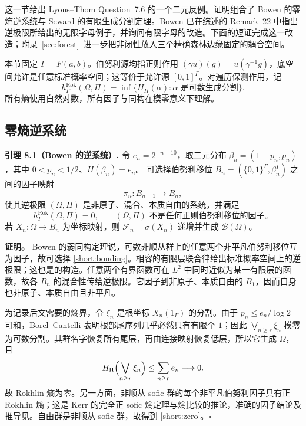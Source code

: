 \documentclass[UTF8,zihao=-4,a4paper]{ctexart}
\numberwithin{equation}{section}
\begin{document}
这一节给出 Lyons--Thom Question~7.6 的一个二元反例。证明组合了 Bowen 的零熵逆系统与 Seward 的有限生成分割定理。Bowen 已在综述的 Remark~22 中指出逆极限所给出的无限字母例子，并询问有限字母的改造\cite[\S5.3, Lemma~5.4; \S7.4, Remark~22]{BowenSurvey}。下面的短证完成这一改造；附录~\ref{sec:forest}~进一步把非闭性放入三个精确森林边缘固定的耦合空间。

本节固定 $\Gamma=F(a,b)$。伯努利源均指正则作用 $(\gamma u)(g)=u(\gamma^{-1}g)$，底空间允许是任意标准概率空间；这等价于允许源 $[0,1]^\Gamma$。对遍历保测作用，记
\[
 h^{\mathrm{Rok}}_\Gamma(\Omega,\Pi)
 =\inf\{H_\Pi(\alpha):\alpha\text{ 是可数生成分割}\}.
\]
所有熵使用自然对数，所有因子与同构在模零意义下理解。

\subsection{零熵逆系统}

\textbf{引理 8.1（Bowen 的逆系统）.}\label{short:inverse}
令 $e_n=2^{-n-10}$，取二元分布 $\beta_n=(1-p_n,p_n)$，其中 $0<p_n<1/2$、$H(\beta_n)=e_n$。
可选择伯努利移位 $B_n=(\{0,1\}^\Gamma,\beta_n^\Gamma)$ 之间的因子映射
\begin{equation}\label{short:bonding}
 \pi_n:B_{n+1}\longrightarrow B_n,
\end{equation}
使其逆极限 $(\Omega,\Pi)$ 是非原子、混合、本质自由的系统，并满足
\begin{equation}\label{short:zero}
 h^{\mathrm{Rok}}_\Gamma(\Omega,\Pi)=0,
 \qquad (\Omega,\Pi)\text{ 不是任何正则伯努利移位的因子。}
\end{equation}
若 $X_n:\Omega\to B_n$ 为坐标映射，则 $\mathcal F_n=\sigma(X_n)$ 递增并生成 $\mathcal B(\Omega)$。

\textbf{证明。}
Bowen 的弱同构定理说，可数非顺从群上的任意两个非平凡伯努利移位互为因子\cite[Corollary~1.3]{Bowen}，故可选择 \eqref{short:bonding}。相容的有限层联合律给出标准概率空间上的逆极限；这也是\cite[Lemma~5.4]{BowenSurvey}的构造。任意两个有界函数可在 $L^2$ 中同时近似为某一有限层的函数，故各 $B_n$ 的混合性传给逆极限。它因子到非原子、本质自由的 $B_1$，因而自身也非原子、本质自由且非平凡。

为记录后文需要的熵界，令 $\xi_n$ 是根坐标 $X_n(1_\Gamma)$ 的分割。由于 $p_n\le e_n/\log2$ 可和，Borel--Cantelli 表明根部尾序列几乎必然只有有限个 $1$；因此 $\bigvee_{n\ge r}\xi_n$ 模零为可数分割。其群名字恢复所有尾层，再由连接映射恢复低层，所以它生成 $\Omega$，且
\[
 H_\Pi\Bigl(\bigvee_{n\ge r}\xi_n\Bigr)
 \le\sum_{n\ge r}e_n\longrightarrow0.
\]
故 Rokhlin 熵为零。另一方面，非顺从 sofic 群的每个非平凡伯努利因子具有正 Rokhlin 熵；这是 Kerr 的完全正 sofic 熵定理\cite{Kerr}与熵比较的推论，准确的因子结论及推导见\cite[Corollary~10.3 的证明]{Bowen}。自由群是非顺从 sofic 群，故得到 \eqref{short:zero}。\hfill$\square$
\end{document}
